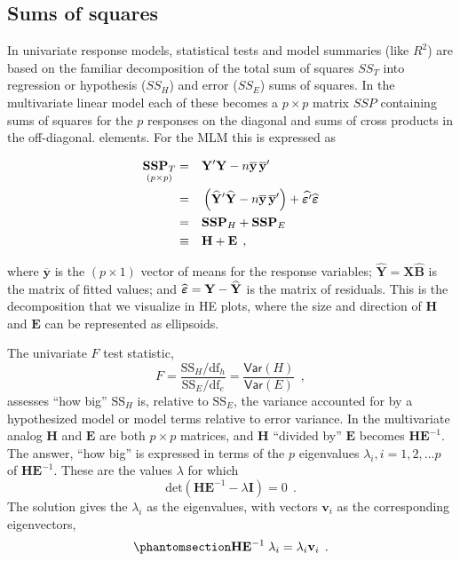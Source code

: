 \documentclass[
  letterpaper,
  10pt,
  krantz2]{krantz}
\begin{document}
\subsection{Sums of squares}\label{sums-of-squares}

In univariate response models, statistical tests and model summaries
(like \(R^2\)) are based on the familiar decomposition of the total sum
of squares \(SS_T\) into regression or hypothesis (\(SS_H\)) and error
(\(SS_E\)) sums of squares. In the multivariate linear model each of
these becomes a \(p \times p\) matrix \(SSP\) containing sums of squares
for the \(p\) responses on the diagonal and sums of cross products in
the off-diagonal. elements. For the MLM this is expressed as

\begin{eqnarray*}
\underset{(p\times p)}{\mathbf{SSP}_{T}}
& = && \mathbf{Y}^{\prime} \mathbf{Y} - n \overline{\mathbf{y}}\,\overline{\mathbf{y}}^{\prime} \\
& = && \left(\widehat {\mathbf{Y}}^{\prime}\widehat{\mathbf{Y}} - n\overline{\mathbf{y}}\,\overline{\mathbf{y}}^{\prime} \right) + \widehat{\boldsymbol{\Large\varepsilon}^{\prime}}\widehat{\boldsymbol{\Large\varepsilon}} \\
& = &&  \mathbf{SSP}_{H} + \mathbf{SSP}_{E} \\
& \equiv && \mathbf{H} + \mathbf{E} \:\: ,
\end{eqnarray*}

where \(\overline{\mathbf{y}}\) is the \((p\times 1)\) vector of means
for the response variables;
\(\widehat{\mathbf{Y}} = \mathbf{X}\widehat{\mathbf{B}}\) is the matrix
of fitted values; and
\(\widehat{\boldsymbol{\Large\varepsilon}} = \mathbf{Y} -\widehat{\mathbf{Y}}\)
is the matrix of residuals. This is the decomposition that we visualize
in HE plots, where the size and direction of \(\mathbf{H}\) and
\(\mathbf{E}\) can be represented as ellipsoids.

The univariate \(F\) test statistic,
\[F = \frac{\text{SS}_H/\text{df}_h}{\text{SS}_E/\text{df}_e} = \frac{\mathsf{Var}(H)}{\mathsf{Var}(E)} \:\: ,
\] assesses ``how big'' \(\text{SS}_H\) is, relative to \(\text{SS}_E\),
the variance accounted for by a hypothesized model or model terms
relative to error variance. In the multivariate analog \(\mathbf{H}\)
and \(\mathbf{E}\) are both \(p \times p\) matrices, and \(\mathbf{H}\)
``divided by'' \(\mathbf{E}\) becomes \(\mathbf{H}\mathbf{E}^{-1}\). The
answer, ``how big'' is expressed in terms of the \(p\) eigenvalues
\(\lambda_i, i = 1, 2, \dots p\) of \(\mathbf{H}\mathbf{E}^{-1}\). These
are the values \(\lambda\) for which \[
\mathrm{det}(\mathbf{H}\mathbf{E}^{-1} - \lambda \mathbf{I}) = 0 \:\: .
\] The solution gives the \(\lambda_i\) as the eigenvalues, with vectors
\(\mathbf{v}_i\) as the corresponding eigenvectors,
\begin{equation}\phantomsection\label{eq-he-eigen}{
\mathbf{H}\mathbf{E}^{-1} \; \lambda_i = \lambda_i \mathbf{v}_i \:\: .
}\end{equation}
\end{document}
